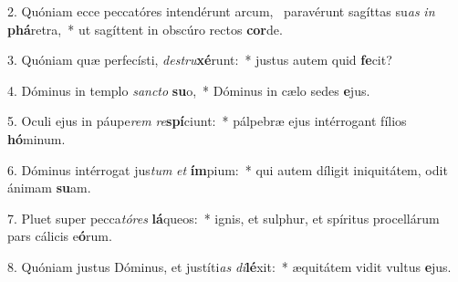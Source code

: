 2. Quóniam ecce peccatóres intendérunt arcum, \dag\  paravérunt sagíttas su\textit{as} \textit{in} \textbf{phá}retra,~*  ut sagíttent in obscúro rectos \textbf{cor}de.\

3. Quóniam quæ perfecísti, \textit{de}\textit{stru}\textbf{xé}runt:~*  justus autem quid \textbf{fe}cit?\

4. Dóminus in templo \textit{sanc}\textit{to} \textbf{su}o,~*  Dóminus in cælo sedes \textbf{e}jus.\

5. Oculi ejus in páupe\textit{rem} \textit{re}\textbf{spí}ciunt:~*  pálpebræ ejus intérrogant fílios \textbf{hó}minum.\

6. Dóminus intérrogat jus\textit{tum} \textit{et} \textbf{ím}pium:~*  qui autem díligit iniquitátem, odit ánimam \textbf{su}am.\

7. Pluet super pecca\textit{tó}\textit{res} \textbf{lá}queos:~*  ignis, et sulphur, et spíritus procellárum pars cálicis e\textbf{ó}rum.\

8. Quóniam justus Dóminus, et justíti\textit{as} \textit{di}\textbf{lé}xit:~*  æquitátem vidit vultus \textbf{e}jus.\


